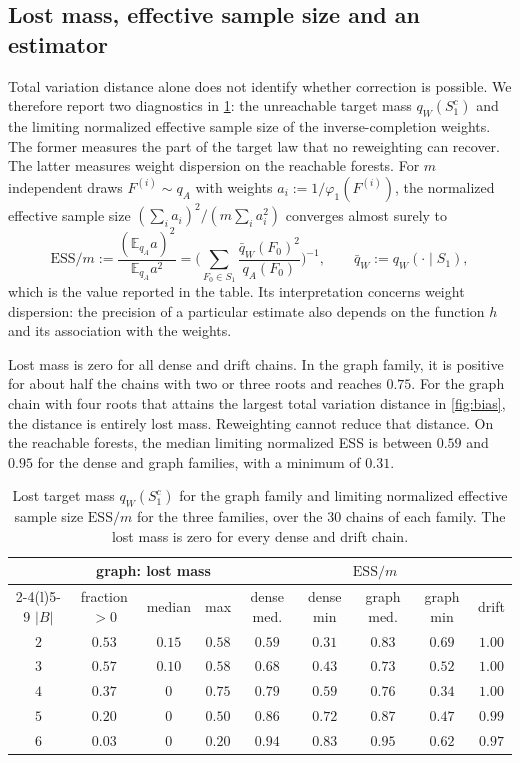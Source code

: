 \documentclass[onefignum,onetabnum]{siamart250211}
\numberwithin{theorem}{section}
\numberwithin{equation}{section}
\providecommand{\E}{}\renewcommand{\E}{\mathbb{E}}
\begin{document}
\subsection{Lost mass, effective sample size and an estimator}
Total variation distance alone does not identify whether correction
is possible. We therefore report two diagnostics in \cref{tab:lost}:
the unreachable target mass $q_W(S_1^c)$ and the limiting normalized
effective sample size of the inverse-completion weights. The former
measures the part of the target law that no reweighting can recover.
The latter measures weight dispersion on the reachable forests.
For $m$ independent draws $F^{(i)}\sim q_A$ with
weights $a_i:=1/\varphi_1(F^{(i)})$, the normalized effective sample size
$(\sum_ia_i)^2/(m\sum_ia_i^2)$ converges almost surely to
\[
\mathrm{ESS}/m:=\frac{(\E_{q_A}a)^2}{\E_{q_A}a^2}
=\Big(\sum_{F_0\in S_1}\frac{\bar q_W(F_0)^2}{q_A(F_0)}\Big)^{-1},
\qquad \bar q_W:=q_W(\cdot\mid S_1),
\]
which is the value reported in the table. Its interpretation concerns
weight dispersion: the precision of a particular estimate also
depends on the function $h$ and its association with the weights.

Lost mass is zero for all dense and drift chains. In the graph
family, it is positive for about half the chains with two or three
roots and reaches $0.75$. For the graph chain with four roots that
attains the largest total variation distance in \cref{fig:bias}, the
distance is entirely lost mass. Reweighting cannot reduce that
distance. On the reachable forests, the median limiting normalized
ESS is between $0.59$ and $0.95$ for the dense and graph families,
with a minimum of $0.31$.

\begin{table}[!htbp]
\caption{Lost target mass $q_W(S_1^c)$ for the graph family and
limiting normalized effective sample size $\mathrm{ESS}/m$ for the three
families, over the $30$ chains of each family. The lost mass is zero
for every dense and drift chain.}\label{tab:lost}
\centering
\footnotesize
\begin{tabular}{@{}ccccccccc@{}}
\toprule
& \multicolumn{3}{c}{graph: lost mass} & \multicolumn{5}{c}{$\mathrm{ESS}/m$}\\
\cmidrule(lr){2-4}\cmidrule(l){5-9}
$|B|$ & fraction $>0$ & median & max & dense med. & dense min & graph med. & graph min & drift\\
\midrule
$2$ & $0.53$ & $0.15$ & $0.58$ & $0.59$ & $0.31$ & $0.83$ & $0.69$ & $1.00$\\
$3$ & $0.57$ & $0.10$ & $0.58$ & $0.68$ & $0.43$ & $0.73$ & $0.52$ & $1.00$\\
$4$ & $0.37$ & $0$ & $0.75$ & $0.79$ & $0.59$ & $0.76$ & $0.34$ & $1.00$\\
$5$ & $0.20$ & $0$ & $0.50$ & $0.86$ & $0.72$ & $0.87$ & $0.47$ & $0.99$\\
$6$ & $0.03$ & $0$ & $0.20$ & $0.94$ & $0.83$ & $0.95$ & $0.62$ & $0.97$\\
\bottomrule
\end{tabular}
\end{table}
\end{document}
